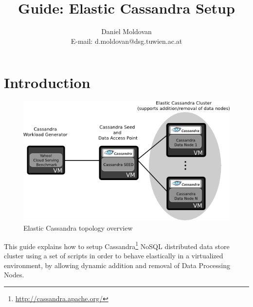 \documentclass[10pt]{report}
\begin{document}
 
%
\title{Guide: Elastic Cassandra Setup}
\author{
Daniel Moldovan\\
E-mail: d.moldovan@dsg.tuwien.ac.at}

\date{}

\maketitle

\tableofcontents
 
 \newpage

\section{Introduction}


\begin{figure}
\centering
\includegraphics[width=\textwidth]{./topologyOverview.png}
\caption{Elastic Cassandra topology overview}
\label{fig:topologyOverview}
\end{figure} 

This guide explains how to setup Cassandra\footnote{\url{http://cassandra.apache.org/}} NoSQL distributed data store cluster using a set of scripts in order to behave elastically in a virtualized environment, by allowing dynamic addition and removal of Data Processing Nodes.
\end{document}
